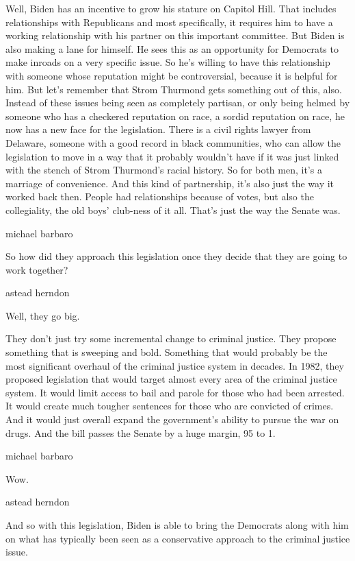Well, Biden has an incentive to grow his stature on Capitol Hill. That
includes relationships with Republicans and most specifically, it
requires him to have a working relationship with his partner on this
important committee. But Biden is also making a lane for himself. He
sees this as an opportunity for Democrats to make inroads on a very
specific issue. So he's willing to have this relationship with someone
whose reputation might be controversial, because it is helpful for him.
But let's remember that Strom Thurmond gets something out of this, also.
Instead of these issues being seen as completely partisan, or only being
helmed by someone who has a checkered reputation on race, a sordid
reputation on race, he now has a new face for the legislation. There is
a civil rights lawyer from Delaware, someone with a good record in black
communities, who can allow the legislation to move in a way that it
probably wouldn't have if it was just linked with the stench of Strom
Thurmond's racial history. So for both men, it's a marriage of
convenience. And this kind of partnership, it's also just the way it
worked back then. People had relationships because of votes, but also
the collegiality, the old boys' club-ness of it all. That's just the way
the Senate was.

michael barbaro

So how did they approach this legislation once they decide that they are
going to work together?

astead herndon

Well, they go big.

They don't just try some incremental change to criminal justice. They
propose something that is sweeping and bold. Something that would
probably be the most significant overhaul of the criminal justice system
in decades. In 1982, they proposed legislation that would target almost
every area of the criminal justice system. It would limit access to bail
and parole for those who had been arrested. It would create much tougher
sentences for those who are convicted of crimes. And it would just
overall expand the government's ability to pursue the war on drugs. And
the bill passes the Senate by a huge margin, 95 to 1.

michael barbaro

Wow.

astead herndon

And so with this legislation, Biden is able to bring the Democrats along
with him on what has typically been seen as a conservative approach to
the criminal justice issue.

